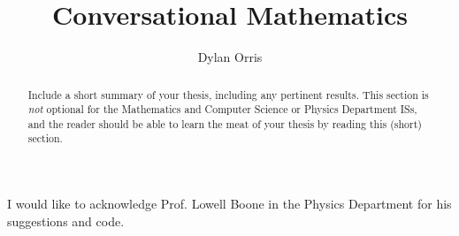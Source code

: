 \documentclass[12pt,code,palatino,picins,blacklinks,kaukecopyright,openright,twoside]{woosterthesis} %
\title{Conversational Mathematics}
\author{Dylan Orris}
\begin{document}
%
%

\frontmatter
\maketitle
\ClearShipoutPicture
\clearpage\thispagestyle{empty}\null\clearpage
\disscopyright 

%                                                                                       
%                                                                                       

\begin{abstract}
Include a short summary of your thesis, including any pertinent results.  This section is \emph{not} optional for the Mathematics and Computer Science or Physics Department ISs, and the reader should be able to learn the meat of your thesis by reading this (short) section.
\end{abstract}

%                                                                                       
%                                                                                       

\dedication{This work is dedicated to the future generations of Wooster students.}


%                                                                                       
%                                                                                       

\begin{acknowl}  
I would like to acknowledge Prof. Lowell Boone in the Physics Department for his suggestions and code.
\end{acknowl}
\end{document}
